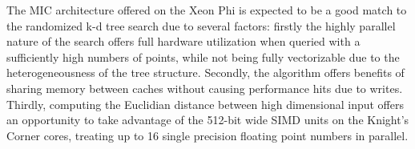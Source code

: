    The MIC architecture offered on the Xeon Phi is expected to be a good match to the randomized k-d tree search 
  due to several factors: firstly the highly parallel nature of the search 
  offers full hardware utilization when queried with a sufficiently high 
  numbers of points, while not being fully vectorizable due to the 
  heterogeneousness of the tree structure.
  Secondly, the algorithm offers benefits of sharing memory between caches 
  without causing performance hits due to writes. Thirdly, computing the 
  Euclidian distance between high dimensional input offers an opportunity to 
  take advantage of the 512-bit wide SIMD units on the Knight's Corner cores, 
  treating up to 16 single precision floating point numbers in parallel.  






